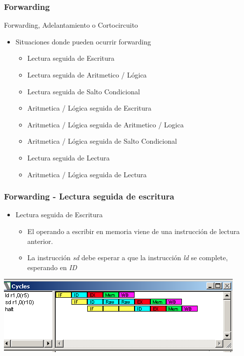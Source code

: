\documentclass{beamer}
\begin{document}
\begin{frame}[fragile]
\frametitle{Forwarding}
Forwarding, Adelantamiento o Cortocircuito
\begin{itemize}
\item Situaciones donde pueden ocurrir forwarding
\begin{itemize}
\item Lectura seguida de Escritura
\item Lectura seguida de Aritmetico / Lógica
\item Lectura seguida de Salto Condicional
\item Aritmetica / Lógica seguida de Escritura
\item Aritmetica / Lógica seguida de Aritmetico / Logica
\item Aritmetica / Lógica seguida de Salto Condicional
\item Lectura seguida de Lectura 
\item Aritmetica / Lógica seguida de Lectura
\end{itemize}
\end{itemize}
\end{frame}


\begin{frame}[fragile]
\frametitle{Forwarding - Lectura seguida de escritura}
\begin{itemize}
\item Lectura seguida de Escritura
\begin{itemize}
\item El operando a escribir en memoria viene de una instrucción de lectura anterior.
\item La instrucción \emph{sd} debe esperar a que la instrucción \emph{ld} se complete, esperando en \emph{ID}
\end{itemize}
\end{itemize}
\includegraphics[scale=0.45]{forwarding-1.png}
\end{frame}
\end{document}
